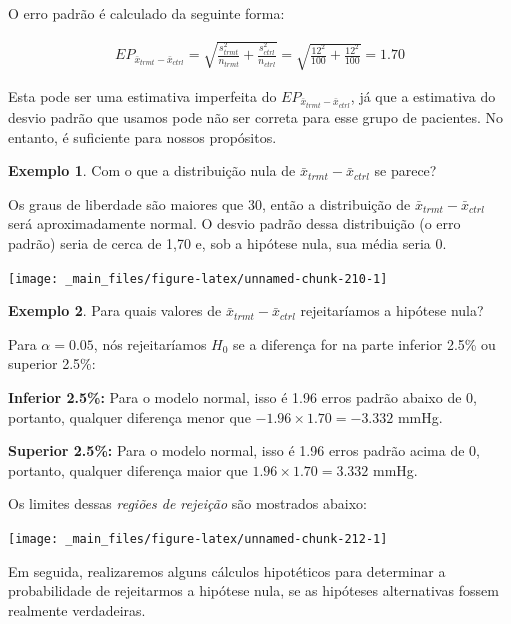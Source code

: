 \documentclass[
]{book}
\theoremstyle{definition}
\theoremstyle{definition}
\newtheorem{example}{Exemplo}[chapter]
\theoremstyle{definition}
\theoremstyle{definition}
\theoremstyle{remark}
\begin{document}
O erro padrão é calculado da seguinte forma:

\begin{align*}
EP_{\bar{x}_{trmt} - \bar{x}_{ctrl}}
  = \sqrt{\frac{s_{trmt}^2}{n_{trmt}} + \frac{s_{ctrl}^2}{n_{ctrl}}}
  = \sqrt{\frac{12^2}{100} + \frac{12^2}{100}}
  = 1.70
\end{align*}

Esta pode ser uma estimativa imperfeita do \(EP_{\bar{x}_{trmt} - \bar{x}_{ctrl}}\), já que a estimativa do desvio padrão que usamos pode não ser correta para esse grupo de pacientes. No entanto, é suficiente para nossos propósitos.

\begin{example}
\protect\hypertarget{exm:unnamed-chunk-209}{}{\label{exm:unnamed-chunk-209} }Com o que a distribuição nula de \(\bar{x}_{trmt} - \bar{x}_{ctrl}\) se parece?
\end{example}

Os graus de liberdade são maiores que 30, então a distribuição de \(\bar{x}_{trmt} - \bar{x}_{ctrl}\) será aproximadamente normal. O desvio padrão dessa distribuição (o erro padrão) seria de cerca de 1,70 e, sob a hipótese nula, sua média seria 0.

\texttt{[image: \_main\_files/figure-latex/unnamed-chunk-210-1]}

\begin{example}
\protect\hypertarget{exm:unnamed-chunk-211}{}{\label{exm:unnamed-chunk-211} }Para quais valores de \(\bar{x}_{trmt} - \bar{x}_{ctrl}\) rejeitaríamos a hipótese nula?
\end{example}

Para \(\alpha = 0.05\), nós rejeitaríamos \(H_0\) se a diferença for na parte inferior 2.5\% ou superior 2.5\%:

\textbf{Inferior 2.5\%:} Para o modelo normal, isso é 1.96 erros padrão abaixo de 0, portanto, qualquer diferença menor que \(-1.96 \times 1.70 = -3.332\) mmHg.

\textbf{Superior 2.5\%:} Para o modelo normal, isso é 1.96 erros padrão acima de 0, portanto, qualquer diferença maior que \(1.96 \times 1.70 = 3.332\) mmHg.

Os limites dessas \emph{regiões de rejeição} são mostrados abaixo:

\texttt{[image: \_main\_files/figure-latex/unnamed-chunk-212-1]}

Em seguida, realizaremos alguns cálculos hipotéticos para determinar a probabilidade de rejeitarmos a hipótese nula, se as hipóteses alternativas fossem realmente verdadeiras.
\end{document}
